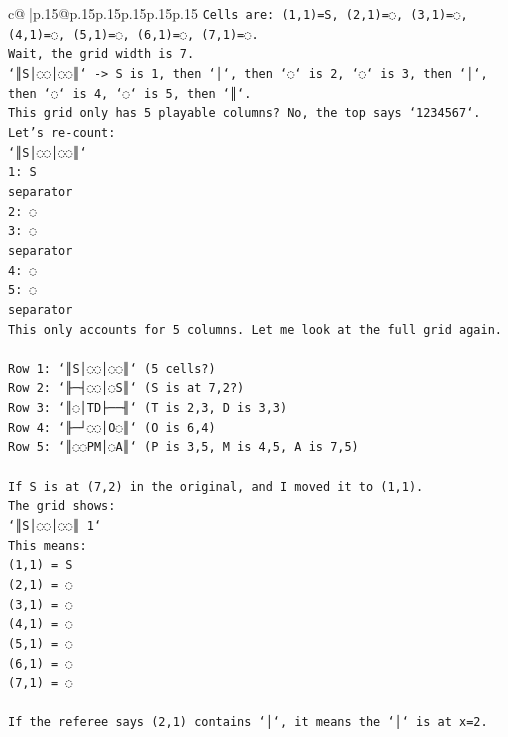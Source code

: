 \documentclass{article}
\begin{document}
{\begin{supertabular}{c@{$\;$}|p{.15\linewidth}@{}p{.15\linewidth}p{.15\linewidth}p{.15\linewidth}p{.15\linewidth}p{.15\linewidth}}
{{{\texttt{Cells are: (1,1)=S, (2,1)=◌, (3,1)=◌, (4,1)=◌, (5,1)=◌, (6,1)=◌, (7,1)=◌.} \\
\texttt{Wait, the grid width is 7.} \\
\texttt{`║S│◌◌│◌◌║` {-}> S is 1, then `│`, then `◌` is 2, `◌` is 3, then `│`, then `◌` is 4, `◌` is 5, then `║`.} \\
\texttt{This grid only has 5 playable columns? No, the top says `1234567`.} \\
\texttt{Let's re{-}count:} \\
\texttt{`║S│◌◌│◌◌║`} \\
\texttt{1: S} \\
\texttt{separator} \\
\texttt{2: ◌} \\
\texttt{3: ◌} \\
\texttt{separator} \\
\texttt{4: ◌} \\
\texttt{5: ◌} \\
\texttt{separator} \\
\texttt{This only accounts for 5 columns. Let me look at the full grid again.} \\
\\ 
\texttt{Row 1: `║S│◌◌│◌◌║` (5 cells?)} \\
\texttt{Row 2: `╟─┤◌◌│◌S║` (S is at 7,2?)} \\
\texttt{Row 3: `║◌│TD├──╢` (T is 2,3, D is 3,3)} \\
\texttt{Row 4: `╟─┘◌◌│O◌║` (O is 6,4)} \\
\texttt{Row 5: `║◌◌PM│◌A║` (P is 3,5, M is 4,5, A is 7,5)} \\
\\ 
\texttt{If S is at (7,2) in the original, and I moved it to (1,1).} \\
\texttt{The grid shows:} \\
\texttt{`║S│◌◌│◌◌║ 1`} \\
\texttt{This means:} \\
\texttt{(1,1) = S} \\
\texttt{(2,1) = ◌} \\
\texttt{(3,1) = ◌} \\
\texttt{(4,1) = ◌} \\
\texttt{(5,1) = ◌} \\
\texttt{(6,1) = ◌} \\
\texttt{(7,1) = ◌} \\
\\ 
\texttt{If the referee says (2,1) contains `│`, it means the `│` is at x=2.} \\
}}}
\end{supertabular}}
\end{document}
